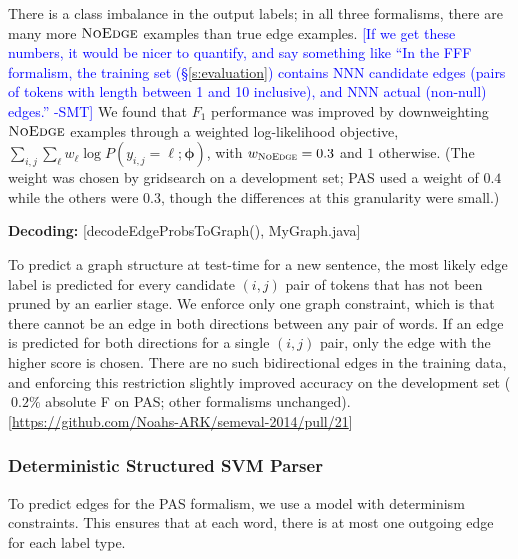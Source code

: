 \documentclass[11pt]{article}
\newcommand{\bocomment}[1]{\textcolor{Bittersweet}{[#1 -BTO]}}
\newcommand{\sam}[1]{\textcolor{blue}{[#1 -SMT]}}
\newcommand{\codenote}[1]{\textcolor{PineGreen}{[#1]}}
\newcommand{\noedge}{\textsc{NoEdge}}
\begin{document}
There is a class imbalance in the output labels; in all three formalisms, there
are many more $\noedge$ examples than true edge examples.
\sam{If we get these numbers, it would be nicer to quantify, and say something
like ``In the FFF formalism, the training set (\S\ref{s:evaluation}) contains NNN
candidate edges (pairs of tokens with length between 1 and 10 inclusive), and NNN actual (non-null) edges.''}
We found that $F_1$ performance was improved by
downweighting $\noedge$ examples through a weighted log-likelihood objective,
$\sum_{i,j} \sum_\ell w_\ell \log P(y_{i,j}=\ell; \bm\phi)$, with $w_{\noedge}=0.3$
and $1$ otherwise.
(The weight was chosen by gridsearch on a development set; 
PAS used a weight of $0.4$ while the others were $0.3$, though the differences at this granularity were small.)



\textbf{Decoding:}
\codenote{decodeEdgeProbsToGraph(), MyGraph.java}

To predict a graph structure at test-time for a new sentence,
the most likely edge label is predicted for every candidate $(i, j)$ pair of
tokens that has not been pruned by an earlier stage.
We enforce only one graph constraint, which is that there cannot be
an edge in both directions between any pair of words.
If an edge is predicted for both directions for a single $(i, j)$
pair, only the edge with the higher score is chosen.
There are no such bidirectional edges in the training data, and enforcing this
restriction slightly improved accuracy on the development set ($~0.2\%$ absolute F on PAS; other formalisms unchanged).\codenote{\url{https://github.com/Noahs-ARK/semeval-2014/pull/21}}


\subsubsection{Deterministic Structured SVM Parser} \label{s:graphparser}

To predict edges for the PAS formalism, we use a model with determinism
constraints.  This ensures that at each word, there is at most one
outgoing edge for each label type.
\end{document}
